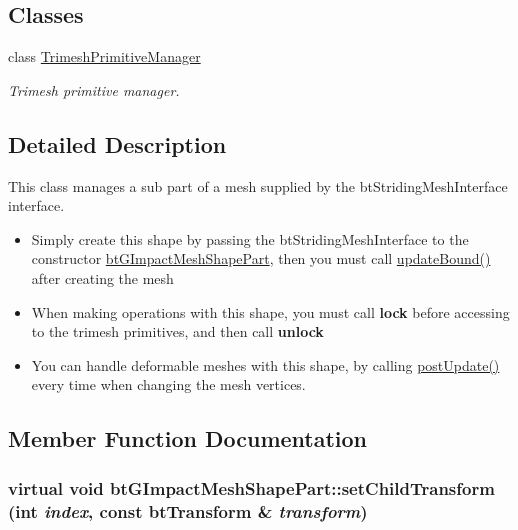 \subsection*{Classes}
\begin{CompactItemize}
\item 
class \hyperlink{classbt_g_impact_mesh_shape_part_1_1_trimesh_primitive_manager}{TrimeshPrimitiveManager}
\begin{CompactList}\small\item\em Trimesh primitive manager. \item\end{CompactList}\end{CompactItemize}


\subsection{Detailed Description}
This class manages a sub part of a mesh supplied by the btStridingMeshInterface interface. 

\begin{itemize}
\item Simply create this shape by passing the btStridingMeshInterface to the constructor \hyperlink{classbt_g_impact_mesh_shape_part}{btGImpactMeshShapePart}, then you must call \hyperlink{classbt_g_impact_shape_interface_cb26c2d7a2aecabd06b996b72b848492}{updateBound()} after creating the mesh\item When making operations with this shape, you must call {\bf lock} before accessing to the trimesh primitives, and then call {\bf unlock}\item You can handle deformable meshes with this shape, by calling \hyperlink{classbt_g_impact_shape_interface_c430754948ac92d6f70b81e88416c96a}{postUpdate()} every time when changing the mesh vertices. \end{itemize}


\subsection{Member Function Documentation}
\hypertarget{classbt_g_impact_mesh_shape_part_0a97d3769fb7d3f583e41da6b284bcc1}{
\subsubsection[setChildTransform]{\setlength{\rightskip}{0pt plus 5cm}virtual void btGImpactMeshShapePart::setChildTransform (int {\em index}, \/  const btTransform \& {\em transform})}}
\label{classbt_g_impact_mesh_shape_part_0a97d3769fb7d3f583e41da6b284bcc1}


